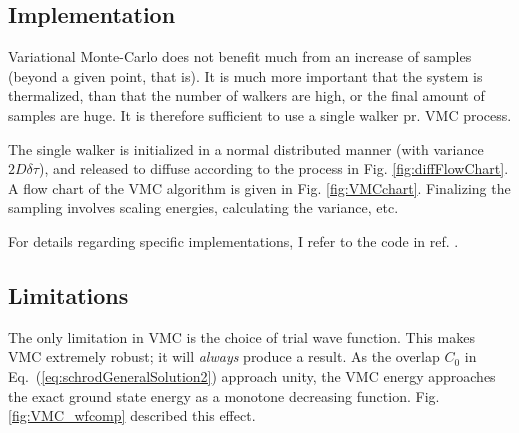 \subsection{Implementation}

Variational Monte-Carlo does not benefit much from an increase of samples (beyond a given point, that is). It is much more important that the system is thermalized, than that the number of walkers are high, or the final amount of samples are huge. It is therefore sufficient to use a single walker pr. VMC process.

The single walker is initialized in a normal distributed manner (with variance $2D\delta\tau$), and released to diffuse according to the process in Fig. \ref{fig:diffFlowChart}. A flow chart of the VMC algorithm is given in Fig. \ref{fig:VMCchart}. Finalizing the sampling involves scaling energies, calculating the variance, etc. 

For details regarding specific implementations, I refer to the code in ref. \cite{libBorealisCode}.

\subsection{Limitations}

The only limitation in VMC is the choice of trial wave function. This makes VMC extremely robust; it will \textit{always} produce a result. As the overlap $C_0$ in Eq.~(\ref{eq:schrodGeneralSolution2}) approach unity, the VMC energy approaches the exact ground state energy as a monotone decreasing function. Fig. \ref{fig:VMC_wfcomp} described this effect.

